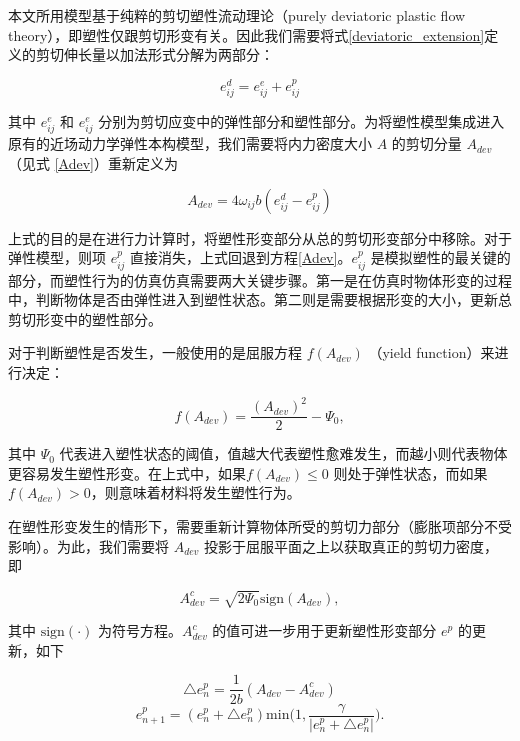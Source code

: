 本文所用模型基于纯粹的剪切塑性流动理论（purely deviatoric plastic flow theory），即塑性仅跟剪切形变有关。因此我们需要将式\ref{deviatoric_extension}定义的剪切伸长量以加法形式分解为两部分：

\begin{equation}
e_{ij}^d = e_{ij}^e+e_{ij}^p
\end{equation}

其中 $e_{ij}^e$ 和 $e_{ij}^e$ 分别为剪切应变中的弹性部分和塑性部分。为将塑性模型集成进入原有的近场动力学弹性本构模型，我们需要将内力密度大小 $A$ 的剪切分量 $A_{dev}$（见式 \ref{Adev}）重新定义为

\begin{equation}
A_{dev} = 4\omega_{ij}b(e_{ij}^d-e_{ij}^p)
\end{equation}

上式的目的是在进行力计算时，将塑性形变部分从总的剪切形变部分中移除。对于弹性模型，则项 $e_{ij}^p$ 直接消失，上式回退到方程\ref{Adev}。$e_{ij}^p$ 是模拟塑性的最关键的部分，而塑性行为的仿真仿真需要两大关键步骤。第一是在仿真时物体形变的过程中，判断物体是否由弹性进入到塑性状态。第二则是需要根据形变的大小，更新总剪切形变中的塑性部分。

对于判断塑性是否发生，一般使用的是屈服方程 $f(A_{dev})$ （yield function）来进行决定：

\begin{equation}
f(A_{dev}) = \frac{(A_{dev})^2}{2}-\Psi_0,
\end{equation}

其中 $\Psi_0$ 代表进入塑性状态的阈值，值越大代表塑性愈难发生，而越小则代表物体更容易发生塑性形变。在上式中，如果$f(A_{dev})\leq 0$ 则处于弹性状态，而如果 $f(A_{dev}) > 0$，则意味着材料将发生塑性行为。

在塑性形变发生的情形下，需要重新计算物体所受的剪切力部分（膨胀项部分不受影响）。为此，我们需要将 $A_{dev}$ 投影于屈服平面之上以获取真正的剪切力密度，即

\begin{equation}
A_{dev}^c=\sqrt{2\Psi_0}\mathrm{sign}(A_{dev}),
\end{equation}

其中 $\mathrm{sign}(\cdot)$ 为符号方程。$A_{dev}^c$ 的值可进一步用于更新塑性形变部分 $e^p$ 的更新，如下

\begin{equation}
\triangle e_n^p = \frac{1}{2b}(A_{dev}-A_{dev}^c)
\end{equation}
\begin{equation}
e_{n+1}^p = (e_n^p+\triangle e_n^p)\mathrm{min}\big(1,\frac{\gamma}{|e_n^p+\triangle e_n^p|}\big).
\end{equation}

